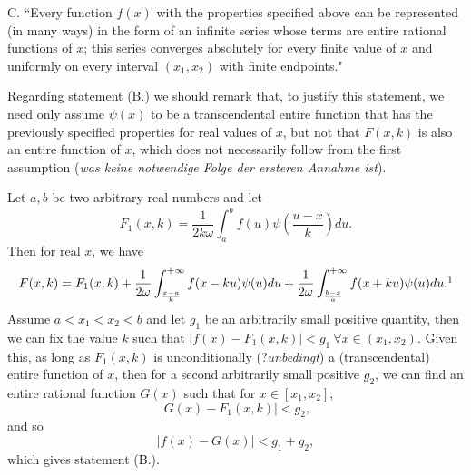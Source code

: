 \documentclass{article}
\begin{document}
C. ``Every function $f(x)$ with the properties specified above can be represented (in many ways) in the form of an infinite series whose terms are entire rational functions of $x$; this series converges absolutely for every finite value of $x$ and uniformly on every interval $(x_1,x_2)$ with finite endpoints."

Regarding statement (B.) we should remark that, to justify this statement, we need only assume $\psi(x)$ to be a transcendental entire function that has the previously specified properties for real values of $x$, but not that $F(x,k)$ is also an entire function of $x$, which does not necessarily follow from the first assumption (\textit{was keine notwendige Folge der ersteren Annahme ist}).

Let $a,b$ be two arbitrary real numbers and let 
\begin{equation*}
F_1(x,k)=\frac{1}{2k\omega}\int_a^b f(u)\psi\left(\frac{u-x}{k}\right)du.
\end{equation*}
Then for real $x$, we have
\begin{equation*}
F(x,k)=F_1(x,k)+\frac{1}{2\omega}\int_{\frac{x-a}{k}}^{+\infty} f(x-ku)\psi(u)du+\frac{1}{2\omega}\int_{\frac{b-x}{a}}^{+\infty}f(x+ku)\psi(u)du.\footnotemark
\end{equation*}
Assume $a<x_1<x_2<b$ and let $g_1$ be an arbitrarily small positive quantity, then we can fix the value $k$ such that $|f(x)-F_1(x,k)|<g_1\ \forall x\in(x_1,x_2)$. Given this, as long as $F_1(x,k)$ is unconditionally (?\textit{unbedingt}) a (transcendental) entire function of $x$, then for a second arbitrarily small positive $g_2$, we can find an entire rational function $G(x)$ such that for $x\in[x_1,x_2]$, 
\begin{equation*}
|G(x)-F_1(x,k)|<g_2,
\end{equation*}
and so 
\begin{equation*}
|f(x)-G(x)|<g_1+g_2,
\end{equation*}
which gives statement (B.). 
\end{document}
